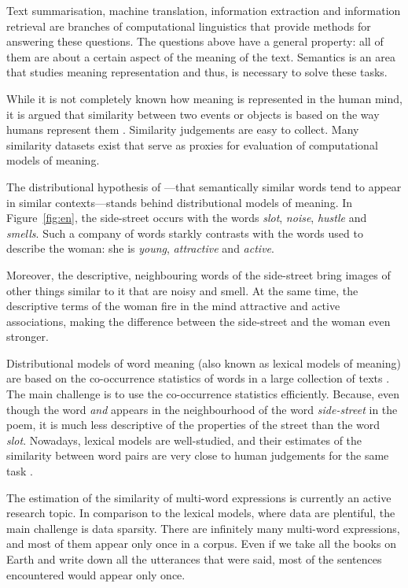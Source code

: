 Text summarisation, machine translation, information extraction and information retrieval are branches of computational linguistics that provide methods for answering these questions. The questions above have a general property: all of them are about a certain aspect of the meaning of the text. Semantics is an area that studies meaning representation and thus, is necessary to solve these tasks.

While it is not completely known how meaning is represented in the human mind, it is argued that similarity between two events or objects is based on the way humans represent them \cite{WCS:WCS1282}. Similarity judgements are easy to collect. Many similarity datasets exist that serve as proxies for evaluation of computational models of meaning.

The distributional hypothesis of \citet{harris1954distributional}---that semantically similar words tend to appear in similar contexts---stands behind distributional models of meaning. In Figure~\ref{fig:en}, the side-street occurs with the words \textit{slot}, \textit{noise}, \textit{hustle} and \textit{smells}. Such a company of words starkly contrasts with the words used to describe the woman: she is \textit{young}, \textit{attractive} and \textit{active}.

Moreover, the descriptive, neighbouring words of the side-street bring images of other things similar to it that are noisy and smell. At the same time, the descriptive terms of the woman fire in the mind attractive and active associations, making the difference between the side-street and the woman even stronger.

Distributional models of word meaning (also known as lexical models of meaning) are based on the co-occurrence statistics of words in a large collection of texts \cite{Turney:2010:FMV:1861751.1861756,mikolov2013linguistic,mikolov2013distributed,mikolov2013efficient}. The main challenge is to use the co-occurrence statistics efficiently. Because, even though the word \textit{and} appears in the neighbourhood of the word \textit{side-street} in the poem, it is much less descriptive of the properties of the street than the word \textit{slot}. Nowadays, lexical models are well-studied, and their estimates of the similarity between word pairs are very close to human judgements  for the same task \cite{TACL570,baroni-dinu-kruszewski:2014:P14-1,Halawi:2012:LLW:2339530.2339751}.

The estimation of the similarity of multi-word expressions is currently an active research topic. In comparison to the lexical models, where data are plentiful, the main challenge is data sparsity. There are infinitely many multi-word expressions, and most of them appear only once in a corpus. Even if we take all the books on Earth and write down all the utterances that were said, most of the sentences encountered would appear only once.

